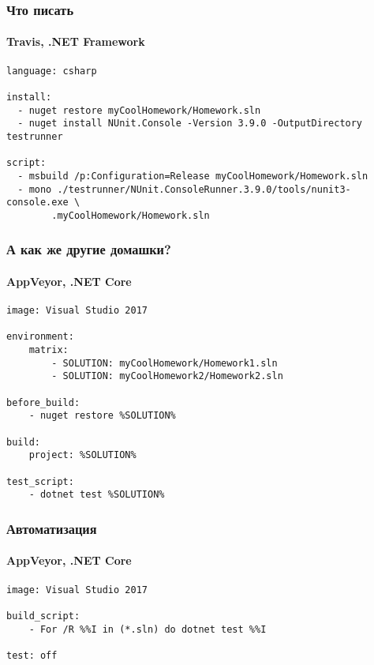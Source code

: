 \documentclass[xetex,mathserif,serif]{beamer}
\begin{document}
	\begin{frame}[fragile]
		\frametitle{Что писать}
		\framesubtitle{Travis, .NET Framework}
		\begin{small}
			\begin{verbatim}
language: csharp

install:
  - nuget restore myCoolHomework/Homework.sln
  - nuget install NUnit.Console -Version 3.9.0 -OutputDirectory testrunner

script:
  - msbuild /p:Configuration=Release myCoolHomework/Homework.sln
  - mono ./testrunner/NUnit.ConsoleRunner.3.9.0/tools/nunit3-console.exe \
        .myCoolHomework/Homework.sln
			\end{verbatim}
		\end{small}
	\end{frame}

	\begin{frame}[fragile]
		\frametitle{А как же другие домашки?}
		\framesubtitle{AppVeyor, .NET Core}
		\begin{verbatim}
image: Visual Studio 2017 

environment:
    matrix:
        - SOLUTION: myCoolHomework/Homework1.sln
        - SOLUTION: myCoolHomework2/Homework2.sln

before_build: 
    - nuget restore %SOLUTION%

build: 
    project: %SOLUTION%

test_script: 
    - dotnet test %SOLUTION%
		\end{verbatim}
	\end{frame}

	\begin{frame}[fragile]
		\frametitle{Автоматизация}
		\framesubtitle{AppVeyor, .NET Core}
		\begin{verbatim}
image: Visual Studio 2017 

build_script: 
    - For /R %%I in (*.sln) do dotnet test %%I

test: off
		\end{verbatim}
	\end{frame}
\end{document}

